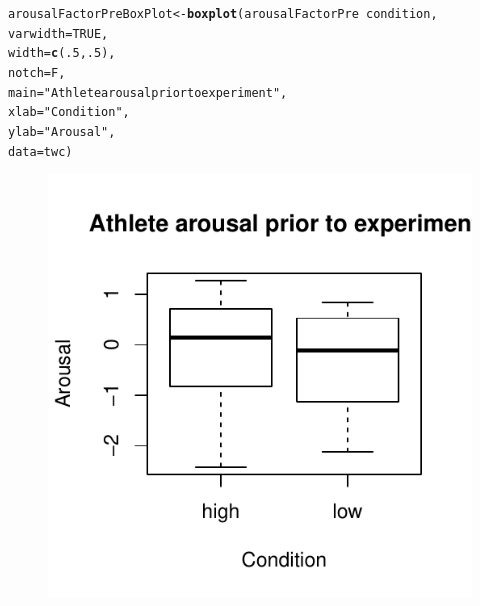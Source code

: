 \documentclass[english]{article}\usepackage[]{graphicx}\usepackage[]{color}
\makeatletter
\def\maxwidth{ %
  \ifdim\Gin@nat@width>\linewidth
    \linewidth
  \else
    \Gin@nat@width
  \fi
}
\newcommand{\hlnum}[1]{\textcolor[rgb]{0.686,0.059,0.569}{#1}}%
\newcommand{\hlstr}[1]{\textcolor[rgb]{0.192,0.494,0.8}{#1}}%
\newcommand{\hlopt}[1]{\textcolor[rgb]{0,0,0}{#1}}%
\newcommand{\hlstd}[1]{\textcolor[rgb]{0.345,0.345,0.345}{#1}}%
\newcommand{\hlkwb}[1]{\textcolor[rgb]{0.69,0.353,0.396}{#1}}%
\newcommand{\hlkwc}[1]{\textcolor[rgb]{0.333,0.667,0.333}{#1}}%
\newcommand{\hlkwd}[1]{\textcolor[rgb]{0.737,0.353,0.396}{\textbf{#1}}}%
\newenvironment{kframe}{%
 \def\at@end@of@kframe{}%
 \ifinner\ifhmode%
  \def\at@end@of@kframe{\end{minipage}}%
  \begin{minipage}{\columnwidth}%
 \fi\fi%
 \def\FrameCommand##1{\hskip\@totalleftmargin \hskip-\fboxsep
 \colorbox{shadecolor}{##1}\hskip-\fboxsep
     \hskip-\linewidth \hskip-\@totalleftmargin \hskip\columnwidth}%
 \MakeFramed {\advance\hsize-\width
   \@totalleftmargin\z@ \linewidth\hsize
   \@setminipage}}%
 {\par\unskip\endMakeFramed%
 \at@end@of@kframe}
\newenvironment{knitrout}{}{} %
\makeatother
\begin{document}
\begin{knitrout}
\color{fgcolor}\begin{kframe}
\begin{alltt}
\hlstd{arousalFactorPreBoxPlot} \hlkwb{<-} \hlkwd{boxplot}\hlstd{(arousalFactorPre} \hlopt{~} \hlstd{condition,}
                                        \hlkwc{varwidth} \hlstd{=} \hlnum{TRUE}\hlstd{,}
                                        \hlkwc{width} \hlstd{=} \hlkwd{c}\hlstd{(}\hlnum{.5}\hlstd{,}\hlnum{.5}\hlstd{),}
                                        \hlkwc{notch} \hlstd{= F,}
                                        \hlkwc{main} \hlstd{=} \hlstr{"Athlete arousal prior to experiment"}\hlstd{,}
                                        \hlkwc{xlab} \hlstd{=} \hlstr{"Condition"}\hlstd{,}
                                        \hlkwc{ylab} \hlstd{=} \hlstr{"Arousal"}\hlstd{,}
                                        \hlkwc{data} \hlstd{= twc)}
\end{alltt}
\end{kframe}\begin{figure}

{\centering \includegraphics[width=\maxwidth]{figure/arousalFactorPreBoxPlot-1} 

}

\end{figure}


\end{knitrout}
\end{document}
